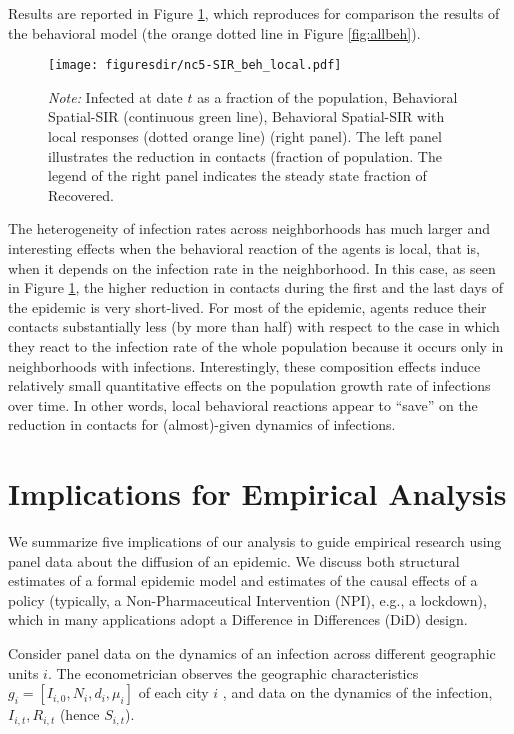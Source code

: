 \documentclass[english,11pt]{article}
\newcommand{\notelegend}{The legend of the right panel indicates the steady state fraction of Recovered.}
\newcommand{\notemix}[4]{\emph{Note:} Infected at date $t$ as a fraction of the population, #1 #2 #3 #4}
\begin{document}
Results are reported in Figure \ref{fig:behav-local}, which reproduces for comparison the results of the behavioral model (the orange dotted line in Figure \ref{fig:allbeh}). 
\begin{figure}
    \caption{The effect of local behavioral responses}
    \label{fig:behav-local}
    \centering
    \texttt{[image: figuresdir/nc5-SIR\_beh\_local.pdf]}
  \caption*{\normalfont \footnotesize \notemix{Behavioral Spatial-SIR (continuous green line),}{ Behavioral Spatial-SIR with local responses (dotted orange line)}{}{} (right panel).
  The left panel 
    illustrates the reduction in contacts (fraction of population. \notelegend}
\end{figure}
The heterogeneity of infection rates across neighborhoods has much larger and interesting effects when the behavioral reaction of the agents is local, that is, when it depends on the infection rate in the neighborhood. In this case, as seen in Figure \ref{fig:behav-local}, the higher reduction in contacts during the first and the last days of the epidemic is very short-lived. For most of the epidemic, agents reduce their contacts substantially less (by more than half) with respect to the case in which they react to the infection rate of the whole population because it occurs only in neighborhoods with infections. Interestingly, these composition effects induce relatively small quantitative effects on the population growth rate of infections over time. In other words, local behavioral reactions appear to ``save'' on the reduction in contacts for (almost)-given dynamics of infections. 


\section{Implications for Empirical Analysis}\label{sec:empirical}

We summarize five implications of our analysis to guide empirical research using panel data about the diffusion of an epidemic.
We discuss both structural estimates of a formal epidemic model 
and estimates of the causal 
effects of a policy (typically, a Non-Pharmaceutical Intervention 
(NPI), e.g., a lockdown), which in many applications adopt a
Difference in Differences (DiD) design.  

Consider panel data on the dynamics of an infection across different geographic units $i$. The econometrician observes the geographic characteristics $g_i=[I_{i,0}, N_i, d_i, \mu_i]$ of each city $i$%
, and data on the dynamics of the infection,   $I_{i,t}, R_{i,t}$ (hence $S_{i,t}$).%
\end{document}
